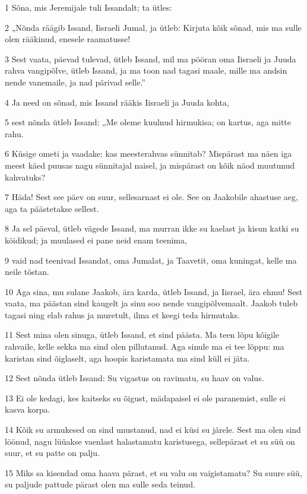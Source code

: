 \par 1 Sõna, mis Jeremijale tuli Issandalt; ta ütles:
\par 2 „Nõnda räägib Issand, Iisraeli Jumal, ja ütleb: Kirjuta kõik sõnad, mis ma sulle olen rääkinud, enesele raamatusse!
\par 3 Sest vaata, päevad tulevad, ütleb Issand, mil ma pööran oma Iisraeli ja Juuda rahva vangipõlve, ütleb Issand, ja ma toon nad tagasi maale, mille ma andsin nende vanemaile, ja nad pärivad selle.”
\par 4 Ja need on sõnad, mis Issand rääkis Iisraeli ja Juuda kohta,
\par 5 sest nõnda ütleb Issand: „Me oleme kuulnud hirmukisa; on kartus, aga mitte rahu.
\par 6 Küsige ometi ja vaadake: kas meesterahvas sünnitab? Mispärast ma näen iga meest käed puusas nagu sünnitajal naisel, ja mispärast on kõik näod muutunud kahvatuks?
\par 7 Häda! Sest see päev on suur, sellesarnast ei ole. See on Jaakobile ahastuse aeg, aga ta päästetakse sellest.
\par 8 Ja sel päeval, ütleb vägede Issand, ma murran ikke su kaelast ja kisun katki su köidikud; ja muulased ei pane neid enam teenima,
\par 9 vaid nad teenivad Issandat, oma Jumalat, ja Taavetit, oma kuningat, kelle ma neile tõstan.
\par 10 Aga sina, mu sulane Jaakob, ära karda, ütleb Issand, ja Iisrael, ära ehmu! Sest vaata, ma päästan sind kaugelt ja sinu soo nende vangipõlvemaalt. Jaakob tuleb tagasi ning elab rahus ja muretult, ilma et keegi teda hirmutaks.
\par 11 Sest mina olen sinuga, ütleb Issand, et sind päästa. Ma teen lõpu kõigile rahvaile, kelle sekka ma sind olen pillutanud. Aga sinule ma ei tee lõppu: ma karistan sind õiglaselt, aga hoopis karistamata ma sind küll ei jäta.
\par 12 Sest nõnda ütleb Issand: Su vigastus on ravimatu, su haav on valus.
\par 13 Ei ole kedagi, kes kaitseks su õigust, mädapaisel ei ole paranemist, sulle ei kasva korpa.
\par 14 Kõik su armukesed on sind unustanud, nad ei küsi su järele. Sest ma olen sind löönud, nagu lüüakse vaenlast halastamatu karistusega, sellepärast et su süü on suur, et su patte on palju.
\par 15 Miks sa kisendad oma haava pärast, et su valu on vaigistamatu? Su suure süü, su paljude pattude pärast olen ma sulle seda teinud.
